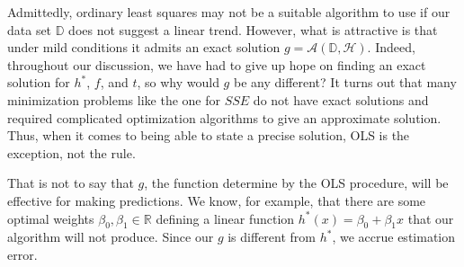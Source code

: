 \documentclass[12pt]{article}
\begin{document}
	 Admittedly, ordinary least squares may not be a suitable algorithm to use
	 if our data set $\mathbb{D}$ does not suggest a linear trend. However, what is
	 attractive is that under mild conditions it admits an exact solution
	 $g=\mathcal{A}(\mathbb{D}, \mathcal{H})$. Indeed, throughout our discussion,
	 we have had to give up hope on finding an exact solution for $h^*$,
	 $f$, and $t$, so why would $g$ be any different? It turns out that many
	 minimization problems like the one for $SSE$ do not have exact solutions
	 and required complicated optimization algorithms to give an approximate
	 solution. Thus, when it comes to being able to state a precise solution,
	 OLS is the exception, not the rule.
	 
	 That is not to say that $g$, the function determine by the OLS procedure,
	 will be effective for making predictions. We know, for example, that there are
	 some optimal weights $\beta_0,\beta_1\in\mathbb{R}$ defining a linear function
	 $h^*(x) = \beta_0+\beta_1 x$ that our algorithm will not produce.
	 Since our $g$ is different from $h^*$, we accrue estimation error.
	\pagebreak
	\printbibliography
	
\end{document}
